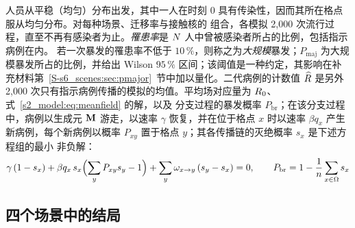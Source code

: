 人员从平稳（均匀）分布出发，其中一人在时刻 $0$ 具有传染性，因而其所在格点服从均匀分布。对每种场景、迁移率与接触核的
组合，各模拟 2{,}000 次流行过程，直至不再有感染者为止。\emph{罹患率}是 $N$ 人中曾被感染者所占的比例，包括指示病例在内。
若一次暴发的罹患率不低于 $10\,\%$，则称之为\emph{大规模}暴发；$P_{\mathrm{maj}}$ 为大规模暴发所占的比例，并给出
Wilson $95\,\%$ 区间；该阈值是一种约定，其影响在补充材料第~\ref{S-s6_scenes:sec:pmajor}~节中加以量化。二代病例的计数值
$\widehat{R}$ 是另外 2{,}000 次只有指示病例传播的模拟的均值。平均场对应量为 $R_0$、式~\eqref{s2_model:eq:meanfield} 的解，以及
分支过程的暴发概率 $P_{\mathrm{br}}$；在该分支过程中，病例以生成元 $\mathbf{M}$ 游走，以速率 $\gamma$ 恢复，并在位于格点 $x$
时以速率 $\beta q_x$ 产生新病例，每个新病例以概率 $P_{xy}$ 置于格点 $y$；其各传播链的灭绝概率 $s_x$ 是下述方程组的最小
非负解\citep{andersson2000stochastic}：
\begin{equation}\label{s6_scenes:eq:branching}
  \gamma\,(1-s_x)+\beta q_x\,s_x\Bigl(\sum_{y}P_{xy}s_y-1\Bigr)+\sum_{y}\omega_{x\to y}\,(s_y-s_x)=0 ,
  \qquad P_{\mathrm{br}}=1-\frac1{n}\sum_{x\in\Omega}s_x
\end{equation}

\subsection{四个场景中的结局}\label{s6_scenes:sec:outcomes}

